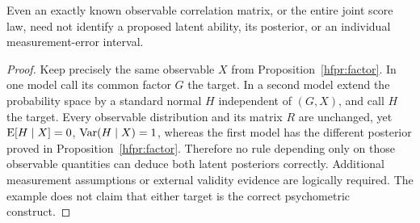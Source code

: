 \begin{proposition}
\label{hfpr:nonidentification}
Even an exactly known observable correlation matrix, or the entire joint
score law, need not identify a proposed latent ability, its posterior, or
an individual measurement-error interval.
\end{proposition}
\begin{proof}
Keep precisely the same observable \(X\) from
Proposition~\ref{hfpr:factor}. In one model call its common factor \(G\)
the target. In a second model extend the probability space by a standard
normal \(H\) independent of \((G,X)\), and call \(H\) the target.
Every observable distribution and its matrix \(R\) are unchanged, yet
\(\operatorname{E}[H\mid X]=0\), \(\operatorname{Var}(H\mid X)=1\), whereas the first model has
the different posterior proved in Proposition~\ref{hfpr:factor}.
Therefore no rule depending only on those observable quantities can
deduce both latent posteriors correctly. Additional measurement assumptions
or external validity evidence are logically required. The example does not
claim that either target is the correct psychometric construct.
\end{proof}

